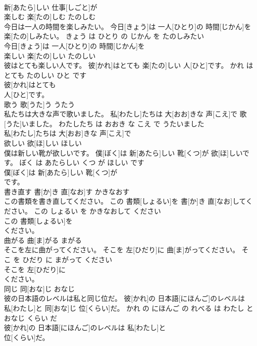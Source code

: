 \documentclass[8pt]{extreport}
\begin{document}
\begin{CJK}{UTF8}{min}
\\	新[あたら]しい 仕事[しごと]が
\\	楽しむ	楽[たの]しむ	たのしむ	
\\	今日は一人の時間を楽しみたい。	今日[きょう]は 一人[ひとり]の 時間[じかん]を 楽[たの]しみたい。	きょう は ひとり の じかん を たのしみたい	
\\	今日[きょう]は 一人[ひとり]の 時間[じかん]を
\\	楽しい	楽[たの]しい	たのしい	
\\	彼はとても楽しい人です。	彼[かれ]はとても 楽[たの]しい 人[ひと]です。	かれ は とても たのしい ひと です	
\\	彼[かれ]はとても
\\	人[ひと]です。			
\\	歌う	歌[うた]う	うたう	
\\	私たちは大きな声で歌いました。	私[わたし]たちは 大[おお]きな 声[こえ]で 歌[うた]いました。	わたしたち は おおき な こえ で うたいました	
\\	私[わたし]たちは 大[おお]きな 声[こえ]で
\\	欲しい	欲[ほ]しい	ほしい	
\\	僕は新しい靴が欲しいです。	僕[ぼく]は 新[あたら]しい 靴[くつ]が 欲[ほ]しいです。	ぼく は あたらしい くつ が ほしい です	
\\	僕[ぼく]は 新[あたら]しい 靴[くつ]が
\\	です。			
\\	書き直す	書[か]き 直[なお]す	かきなおす	
\\	この書類を書き直してください。	この 書類[しょるい]を 書[か]き 直[なお]してください。	この しょるい を かきなおして ください	
\\	この 書類[しょるい]を
\\	ください。			
\\	曲がる	曲[ま]がる	まがる	
\\	そこを左に曲がってください。	そこを 左[ひだり]に 曲[ま]がってください。	そこ を ひだり に まがって ください	
\\	そこを 左[ひだり]に
\\	ください。			
\\	同じ	同[おな]じ	おなじ	
\\	彼の日本語のレベルは私と同じ位だ。	彼[かれ]の 日本語[にほんご]のレベルは 私[わたし]と 同[おな]じ 位[くらい]だ。	かれ の にほんご の れべる は わたし と おなじ くらい だ	
\\	彼[かれ]の 日本語[にほんご]のレベルは 私[わたし]と
\\	位[くらい]だ。			

\end{CJK}
\end{document}
